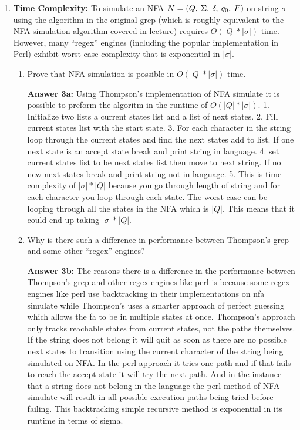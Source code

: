 \documentclass[12pt,letterpaper]{ntdhw}
\begin{document}
\begin{enumerate}
  \item \textbf{Time Complexity:} To simulate an NFA
  $N=\lmtuple{Q}{\Sigma}{\delta}{q_0}{F}$ on string $\sigma$ using the
  algorithm in the original grep (which is roughly equivalent to the
  NFA simulation algorithm covered in lecture) requires
  $O(|Q|*|\sigma|)$ time. However, many ``regex'' engines (including the
  popular implementation in Perl) exhibit worst-case complexity that
  is exponential in $|\sigma|$.

  \begin{enumerate}
    \item Prove that NFA simulation is possible in $O(|Q|*|\sigma|)$
      time.%
      \par \textbf{Answer 3a:} Using Thompson's implementation of NFA simulate it is possible to preform the algoritm in the runtime of $O(|Q|*|\sigma|)$. 1. Initialize two lists a current states list and a list of next states.
    2. Fill current states list with the start state. 
    3. For each character in the string loop through the current states and find the next states add to list. If one next state is an accept state break and print string in language. 
    4. set current states list to be next states list then move to next string. If no new next states break and print string not in language.
    5. This is time complexity of $|\sigma| * |Q|$ because you go through length of string and for each character you loop through each state. The worst case can be looping through all the states in the NFA which is $|Q|$. This means that it could end up taking  $|\sigma| * |Q|$.

    \item Why is there such a difference in performance between
      Thompson's grep and some other ``regex'' engines?
      \par \textbf{Answer 3b:} The reasons there is a difference in the performance between Thompson's grep and other regex engines like perl is because some regex engines like perl use backtracking in their implementations on nfa simulate while Thompson's uses a smarter approach of perfect guessing which allows the fa to be in multiple states at once. Thompson's approach only tracks reachable states from current states, not the paths themselves. If the string does not belong it will quit as soon as there are no possible next states to transition using the current character of the string being simulated on NFA. In the perl approach it tries one path and if that fails to reach the accept state it will try the next path. And in the instance that a string does not belong in the language the perl method of NFA simulate will result in all possible execution paths being tried before failing. This backtracking simple recursive method is exponential in its runtime in terms of sigma. 
  \end{enumerate}




\end{enumerate}
\end{document}
